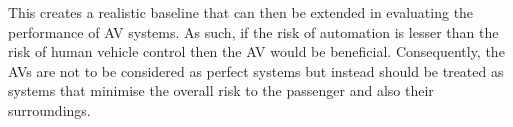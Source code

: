 This creates a realistic baseline that can then be extended in evaluating the performance of AV systems. As such, if the risk of automation is lesser than the risk of human vehicle control then the AV would be beneficial. Consequently, the AVs are not to be considered as perfect systems but instead should be treated as systems that minimise the overall risk to the passenger and also their surroundings. 



%
%
%
%
%
%
%
%
